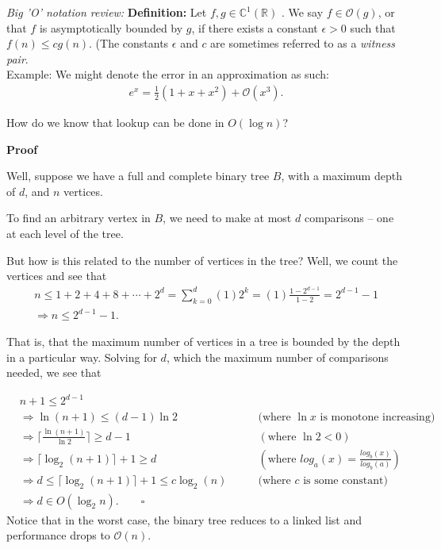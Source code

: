 \documentclass[a4paper,10pt]{report}
\begin{document}
\textit{Big 'O' notation review:}
\textbf{Definition:} Let $f,g \in \mathbb{C}^{1}(\mathbb{R})$ . We say $f\in \mathcal{O}(g)$, or that $f$ is asymptotically bounded by $g$, if there exists a constant $\epsilon>0$ such that $f(n)\leq cg(n)$. (The constants $\epsilon$ and $c$ are sometimes referred to as a \textit{witness pair}. \\

Example: We might denote the error in an approximation as such:
\begin{align*}
	e^x = \frac{1}{2}(1+x+x^2) + \mathcal{O}(x^3).
\end{align*}


How do we know that lookup can be done in $O(\log n)$?

\textbf{Proof}

Well, suppose we have a full and complete binary tree $B$, with a maximum depth of $d$, and $n$ vertices.

To find an arbitrary vertex in $B$, we need to make at most $d$ comparisons -- one at each level of the tree.

But how is this related to the number of vertices in the tree?
Well, we count the vertices and see that
\begin{align*}
	n \leq 1 + 2 + 4 + 8 + \cdots + 2^d = \sum_{k=0}^d (1)2^k =(1)\frac{1-2^{d-1}}{1-2} = 2^{d-1} -1 \\
	\Rightarrow n \leq 2^{d-1} -1.
\end{align*}

That is, that the maximum number of vertices in a tree is bounded by the depth in a particular way. Solving for $d$, which the maximum number of comparisons needed, we see that

\begin{align*}
	&n+1 \leq 2^{d-1}  \\
	&\Rightarrow \ln(n+1) \leq (d-1)\ln 2  &\qquad\text{(where $\ln x$ is monotone increasing)} \\
	&\Rightarrow \lceil \frac{\ln(n+1)}{\ln 2}\rceil \geq d-1 &\qquad (\text{where }\ln 2 < 0) \\
	&\Rightarrow \lceil \log_2(n+1)\rceil+1 \geq d  &\qquad (\text{where $log_a(x) = \frac{log_b(x)}{log_b(a)}$})\\
	&\Rightarrow d \leq \lceil\log_2(n+1)\rceil +1 \leq c\log_2(n) &\qquad\text{(where $c$ is some constant)} \\
	&\Rightarrow d \in O(\log_2 n). \qquad \square
\end{align*}
Notice that in the worst case, the binary tree reduces to a linked list and performance drops to $\mathcal{O}(n)$.
\end{document}
